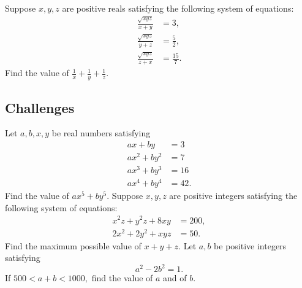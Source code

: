 \documentclass[../jarvis.tex]{subfiles}
\begin{document}
\problem[2018 SMO(S) P25]Suppose $x,y,z$ are positive reals satisfying the following system of equations:
\begin{align*}
    \frac{\sqrt{xyz}}{x+y}&=3,\\
    \frac{\sqrt{xyz}}{y+z}&=\frac{5}{2},\\
    \frac{\sqrt{xyz}}{z+x}&=\frac{15}{7}.
\end{align*}
Find the value of $\frac{1}{x}+\frac{1}{y}+\frac{1}{z}.$

\subsection{Challenges}
\problem[1990 AIME P15]Let $a,b,x,y$ be real numbers satisfying
\begin{align*}
    ax+by&=3 \\
    ax^2+by^2&=7 \\
    ax^3+by^3&=16 \\
    ax^4+by^4&=42.
\end{align*}
Find the value of $ax^5+by^5$.
\problem[2019 SMO(S) P16]Suppose $x,y,z$ are positive integers satisfying the following system of equations:
\begin{align*}
    x^2z+y^2z+8xy&=200,\\
    2x^2+2y^2+xyz&=50.
\end{align*}
Find the maximum possible value of $x+y+z$.
\problem[2019 SMO(S) P25]Let $a,b$ be positive integers satisfying
$$a^2-2b^2=1.$$
If $500<a+b<1000,$ find the value of $a$ and of $b$.
\end{document}

